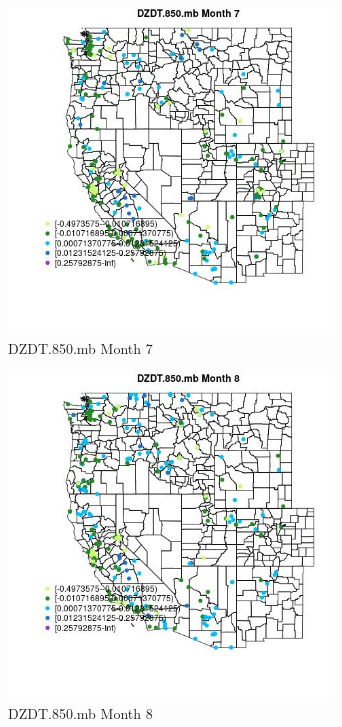 \begin{figure} 
\centering  
\includegraphics[width=0.77\textwidth]{Code_Outputs/Report_ML_input_PM25_Step4_part_e_de_duplicated_aveswNAs_MapObsMo7DZDT850mb.jpg} 
\caption{\label{fig:Report_ML_input_PM25_Step4_part_e_de_duplicated_aveswNAsMapObsMo7DZDT850mb}DZDT.850.mb Month 7} 
\end{figure} 
 

\begin{figure} 
\centering  
\includegraphics[width=0.77\textwidth]{Code_Outputs/Report_ML_input_PM25_Step4_part_e_de_duplicated_aveswNAs_MapObsMo8DZDT850mb.jpg} 
\caption{\label{fig:Report_ML_input_PM25_Step4_part_e_de_duplicated_aveswNAsMapObsMo8DZDT850mb}DZDT.850.mb Month 8} 
\end{figure} 
 

